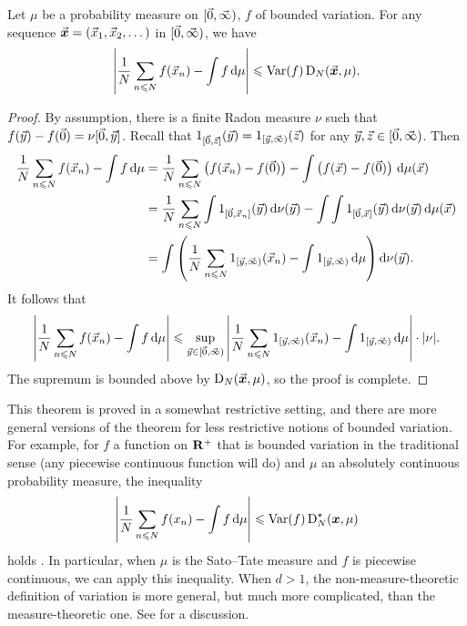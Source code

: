 \begin{theorem}\label{thm:koksma-hlawka}
Let $\mu$ be a probability measure on $[\vec{0},\vec{\infty})$, $f$ of bounded 
variation. For any sequence $\vec{\boldsymbol x} = (\vec{x}_1,\vec{x}_2,\dots)$ in $[\vec{0},\vec{\infty})$, 
we have 
\[
	\left| \frac{1}{N} \sum_{n\leqslant N} f(\vec{x}_n) - \int f\, \mathrm{d}\mu \right| \leqslant \operatorname{Var}(f) \operatorname{D}_N(\vec{\boldsymbol x},\mu) .
\]
\end{theorem}
\begin{proof}
By assumption, there is a finite Radon measure $\nu$ 
such that $f(\vec{y}) - f(\vec{0}) = \nu[\vec{0},\vec{y}]$. Recall that 
$1_{[\vec{0},\vec{z}]}(\vec{y}) = 1_{[\vec{y},\vec{\infty})}(\vec{z})$ for any 
$\vec{y},\vec{z}\in [\vec{0},\vec{\infty})$. Then 
\begin{align*}
	\frac{1}{N} \sum_{n\leqslant N} f(\vec{x}_n) - \int f\, \mathrm{d}\mu 
		&= \frac{1}{N} \sum_{n\leqslant N} \left(f(\vec{x}_n) - f(\vec{0})\right) - \int \left(f(\vec{x}) - f(\vec{0})\right)\, \mathrm{d}\mu(\vec{x}) \\
		&= \frac{1}{N} \sum_{n\leqslant N} \int 1_{[\vec{0},\vec{x}_n]}(\vec{y})\, \mathrm{d} \nu(\vec{y}) - \int \int 1_{[\vec{0},\vec{x}]}(\vec{y})\, \mathrm{d}\nu(\vec{y}) \, \mathrm{d}\mu(\vec{x}) \\
		&= \int \left(\frac{1}{N} \sum_{n\leqslant N} 1_{[\vec{y},\vec{\infty})}(\vec{x}_n) - \int 1_{[\vec{y},\vec{\infty})}\, \mathrm{d}\mu \right) \mathrm{d}\nu(\vec{y}) .
\end{align*}
It follows that 
\[
	\left| \frac{1}{N} \sum_{n\leqslant N} f(\vec{x}_n) - \int f\, \mathrm{d}\mu \right|
		\leqslant \sup_{\vec{y}\in [\vec{0},\vec{\infty})} \left| \frac{1}{N} \sum_{n\leqslant N} 1_{[\vec{y},\vec{\infty})}(\vec{x}_n) - \int 1_{[\vec{y},\vec{\infty})}\, \mathrm{d}\mu\right| \cdot |\nu| .
\]
The supremum is bounded above by $\operatorname{D}_N(\vec{\boldsymbol x},\mu)$, so the proof is complete. 
\end{proof}

This theorem is proved in a somewhat restrictive setting, and there are more 
general versions of the theorem for less restrictive notions of bounded 
variation. For example, for $f$ a function on $\mathbf{R}^+$ that is bounded variation 
in the traditional sense (any piecewise continuous function will do) and $\mu$ 
an absolutely continuous probability measure, the inequality 
\[
	\left| \frac{1}{N} \sum_{n\leqslant N} f(x_n) - \int f\, \mathrm{d}\mu\right| \leqslant \operatorname{Var}(f) \operatorname{D}_N^\star({\boldsymbol x},\mu) 
\]
holds \cite[Ch.~2, Th.~5.1]{kuipers-niederreiter-1974}. In particular, 
when $\mu$ is the Sato--Tate measure and $f$ is piecewise continuous, we can 
apply this inequality. When $d>1$, the non-measure-theoretic definition of 
variation is more general, but much more complicated, than the 
measure-theoretic one. See \cite[2\S5]{kuipers-niederreiter-1974} for a 
discussion. 





